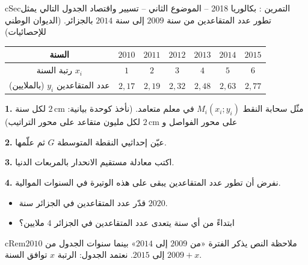 \documentclass[12pt,a4paper]{article}
\newenvironment{BOX}[2]{\begin{otherlanguage}{english}\begin{arbox}{#1}{#2}}{\end{arbox}\end{otherlanguage}}
\newenvironment{molahada}[1][ملاحظة]{\begin{BOX}{cRem}{#1}}{\end{BOX}}
\newcounter{exo}
\newenvironment{tamrin}[1]{\stepcounter{exo}\begin{BOX}{cSec}{التمرين \theexo: #1}}{\end{BOX}}
\newcommand{\QQ}[1]{\par\smallskip\textbf{#1.} }
\begin{document}
\begin{tamrin}{بكالوريا 2018 -- الموضوع الثاني -- تسيير واقتصاد}
الجدول التالي يمثل تطور عدد المتقاعدين من سنة $2009$ إلى سنة $2014$ بالجزائر. (الديوان الوطني للإحصائيات)
\begin{center}
\begin{tabular}{|C|c|c|c|c|c|c|}\hline
{} السنة & $2010$ & $2011$ & $2012$ & $2013$ & $2014$ & $2015$\\\hline
رتبة السنة $x_i$ & $1$ & $2$ & $3$ & $4$ & $5$ & $6$\\\hline
عدد المتقاعدين $y_i$ (بالملايين) & $2{,}17$ & $2{,}19$ & $2{,}32$ & $2{,}48$ & $2{,}63$ & $2{,}77$\\\hline
\end{tabular}
\end{center}

\QQ{1} مثّل سحابة النقط $M_i(x_i;y_i)$ في معلم متعامد. (نأخذ كوحدة بيانية: $2\,\text{cm}$ لكل سنة على محور الفواصل و $2\,\text{cm}$ لكل مليون متقاعد على محور التراتيب)
\QQ{2} عيّن إحداثيي النقطة المتوسطة $G$ ثم علّمها.
\QQ{3} اكتب معادلة مستقيم الانحدار بالمربعات الدنيا.
\QQ{4} نفرض أن تطور عدد المتقاعدين يبقى على هذه الوتيرة في السنوات الموالية.
\begin{itemize}
\item قدّر عدد المتقاعدين في الجزائر سنة $2020$.
\item ابتداءً من أي سنة يتعدى عدد المتقاعدين في الجزائر $4$ ملايين؟
\end{itemize}
\end{tamrin}
\begin{molahada}
النص يذكر الفترة «من $2009$ إلى $2014$» بينما سنوات الجدول من $2010$ إلى $2015$. نعتمد الجدول: الرتبة $x$ توافق السنة $2009+x$.
\end{molahada}
\Needspace{10.5cm}
\end{document}
